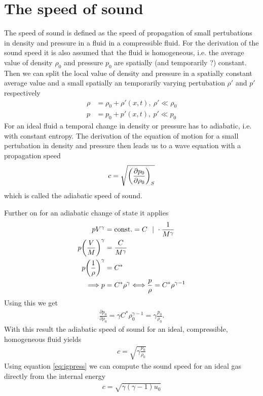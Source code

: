 \section{The speed of sound}
The speed of sound is defined as the speed of propagation of small pertubations
in density and pressure in a fluid in a compressible fluid. For the derivation
of the sound speed it is also assumed that the fluid is homogeneous, i.e. the
average value of density $\rho_0$ and pressure $p_0$ are spatially (and
temporarily ?) constant. Then we can split the local value of density and
pressure in a spatially constant average value and a small spatially an
temporarily varying pertubation $\rho'$ and $p'$ respectively
\begin{align}
\rho &= \rho_0 + \rho'(x,t),\ \rho' \ll \rho_0 \\
p &= p_0 + p'(x,t),\ p' \ll p_0
\end{align}
For an ideal fluid a temporal change in density or pressure has to adiabatic,
i.e. with constant entropy. The derivation of the equation of motion for a small
pertubation in density and pressure then leads us to a wave equation with a
propagation speed
\begin{align}
c=\sqrt{{ \left( \frac{\partial p_0}{\partial \rho_0} \right) }_S}
\end{align}
which is called the adiabatic speed of sound. 

Further on for an adiabatic change of state it applies
\begin{align}
p V^\gamma &= \text{const.} = C \ \ |\ \cdot\frac{1}{M^\gamma}\\
p { \left( \frac{V}{M} \right) }^\gamma &= \frac{C}{M^\gamma}\\
p { \left( \frac{1}{\rho} \right) }^\gamma &= C^*\\
\Longrightarrow 
p &= C^* \rho^\gamma \Longleftrightarrow \frac{p}{\rho} = C^* \rho^{\gamma-1}
\end{align}
Using this we get
\begin{align}
\frac{\partial p_0}{\partial \rho_0} = \gamma C^* \rho_0^{\gamma-1} 
= \gamma \frac{p_0}{\rho_0}.
\end{align}
With this result the adiabatic speed of sound for an ideal, compressible,
homogeneous fluid yields
\begin{align}
c=\sqrt{\gamma \frac{p_0}{\rho_0}}
\end{align}
Using equation \eqref{eq:igpress} we can compute the sound speed for an ideal gas 
directly from the internal energy
\begin{align}
c=\sqrt{\gamma (\gamma-1) u_0}
\end{align}
